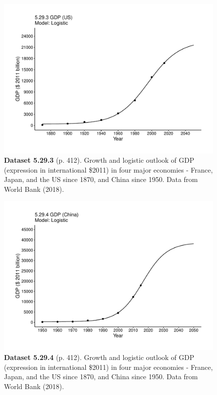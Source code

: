 \documentclass[aps,rmp,preprint,superscriptaddress,10pt,onecolumn]{article}
\begin{document}
\clearpage
\begin{figure}[h]
\includegraphics[width=\textwidth]{output/figs-ggplot/5.29.3.pdf}
\caption*{\textbf{Dataset 5.29.3} (p. 412). Growth and logistic outlook of GDP (expression in international \$2011) in four major economies - France, Japan, and the US since 1870, and China since 1950. Data from World Bank (2018).}
\end{figure}
	
\clearpage
\begin{figure}[h]
\includegraphics[width=\textwidth]{output/figs-ggplot/5.29.4.pdf}
\caption*{\textbf{Dataset 5.29.4} (p. 412). Growth and logistic outlook of GDP (expression in international \$2011) in four major economies - France, Japan, and the US since 1870, and China since 1950. Data from World Bank (2018).}
\end{figure}
	
\end{document}
